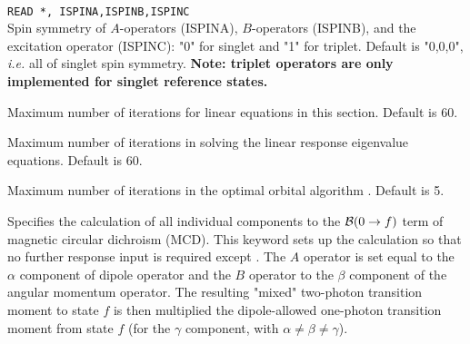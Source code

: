 \begin{description}
\item{}\\
\verb|READ *, ISPINA,ISPINB,ISPINC|\\
Spin symmetry of $A$-operators (ISPINA), $B$-operators (ISPINB),
and the excitation operator (ISPINC): "0" for singlet and "1" for triplet.
Default is "0,0,0", {\it i.e.\/} all of singlet spin symmetry.
{\bf Note: triplet operators are only implemented for singlet reference states.}

\item{}
Maximum number of iterations for linear equations in this section.
Default is 60.

\item{}
Maximum number of iterations in solving the linear
response eigenvalue 
equations.
Default is 60.

\item{}
Maximum number of iterations in the optimal
orbital algorithm 
\cite{tuhjahjajpjjcp84}. 
Default is 5.

\item{}
Specifies the calculation of all individual components to the 
${\cal{B}}(0\to f)$ term of magnetic circular dichroism
(MCD).
This keyword sets up the calculation so that no further response input is required except . 
The $A$ operator is set equal to the $\alpha$ component of dipole 
operator and
the $B$ operator to the $\beta$ component of the angular momentum
operator. The resulting "mixed" two-photon transition moment to state $f$ 
is then multiplied the dipole-allowed one-photon transition moment 
from state $f$ (for the $\gamma$ component, with $\alpha \neq \beta \neq \gamma$).
\cite{Coriani:MCDRSP} 


\end{description}
